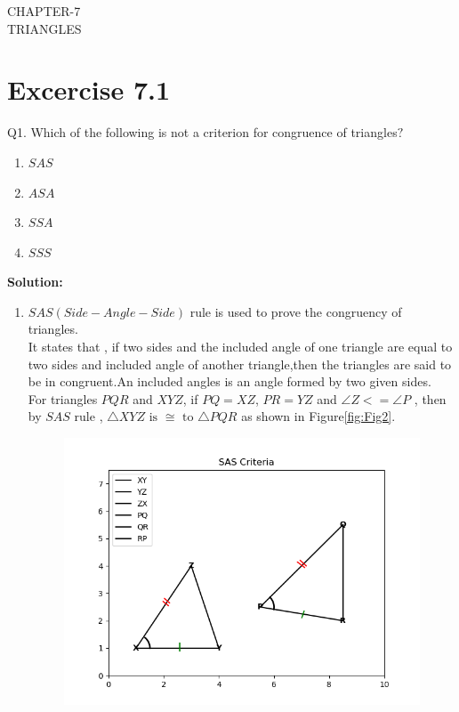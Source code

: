 \documentclass[12pt]{article}
\newcommand{\solution}{\noindent \textbf{Solution: }}
\begin{document}
\begin{center}
\textbf\large{CHAPTER-7 \\ TRIANGLES}
\end{center}
\section*{Excercise 7.1}

Q1. Which of the following is not a criterion for congruence of triangles$?$
\begin{enumerate}
\item $SAS$
\item $ASA$
\item $SSA$
\item $SSS$
\end{enumerate}

\solution
\begin{enumerate}
\item $SAS(Side-Angle-Side)$ rule is used to prove the congruency of triangles.\\
It states that , if two sides and the included angle of one triangle are equal to two sides and included angle of another triangle,then the triangles are said to be in congruent.An included angles is an angle formed by two given sides.\\
		For triangles $PQR$ and $XYZ$, if $PQ = XZ$, $PR = YZ$ and $\angle Z <= \angle P$ , then by $SAS$ rule , $\triangle XYZ \text{ is } \cong \text{ to }  \triangle PQR$  as shown in Figure\ref{fig:Fig2}.
		\begin{figure}[!h]
  \begin{center} 
      \includegraphics[width=\columnwidth]{./figs/graph2.png}

\end{center}
\end{figure}
\end{enumerate}
\end{document}
